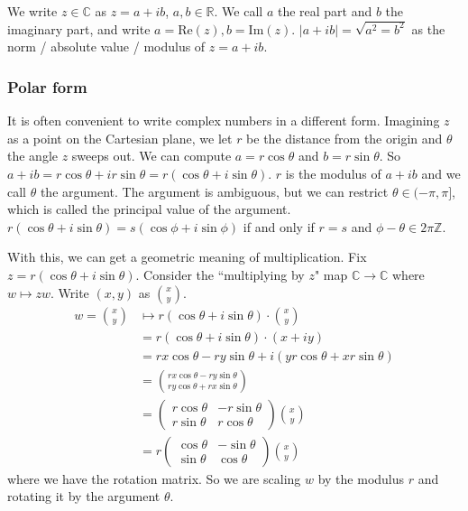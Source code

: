 \documentclass{article}
\theoremstyle{plain}
\theoremstyle{remark}
\newcommand{\Z}{{\mathbb Z}}
\newcommand{\R}{{\mathbb R}}
\newcommand{\C}{{\mathbb C}}
\begin{document}
We write $z \in \C$ as $z = a+ib$, $a,b \in \R$.
We call $a$ the real part and $b$ the imaginary part,
and write $a = \mathrm{Re}(z), b = \mathrm{Im}(z)$.
$|a+ib| = \sqrt{a^2 = b^2}$ as the norm / absolute value / modulus of $z = a + ib$.

\subsubsection{Polar form}
It is often convenient to write complex numbers in a different form.
Imagining $z$ as a point on the Cartesian plane,
we let $r$ be the distance from the origin and $\theta$ the angle $z$ sweeps out.
We can compute $a = r\cos\theta$ and $b = r\sin\theta$.
So $a+ib = r\cos\theta + ir\sin\theta = r(\cos\theta + i\sin\theta)$.
$r$ is the modulus of $a + ib$ and we call $\theta$ the argument.
The argument is ambiguous, but we can restrict $\theta \in (-\pi,\pi]$,
which is called the principal value of the argument.
$r(\cos\theta + i\sin\theta) = s(\cos\phi + i\sin\phi)$ if and only if
$r = s$ and $\phi - \theta \in 2\pi\Z$.

With this, we can get a geometric meaning of multiplication.
Fix $z = r(\cos\theta +i \sin\theta)$.
Consider the ``multiplying by $z$" map $\C \to \C$ where $w \mapsto zw$.
Write $(x,y)$ as $\binom{x}{y}$.
\begin{align*}
	w = \binom{x}{y} &\mapsto r(\cos\theta + i\sin\theta)\cdot\binom{x}{y}\\
	&= r(\cos\theta + i\sin\theta)\cdot(x+iy)\\
	&= rx\cos\theta - ry\sin\theta + i(yr\cos\theta + xr\sin\theta)\\
	&= \binom{rx\cos\theta - ry\sin\theta}{ry\cos\theta+rx\sin\theta}\\
	&= \begin{pmatrix} r\cos\theta & -r\sin\theta\\ r\sin\theta & r\cos\theta \end{pmatrix}
	\binom{x}{y}\\
	&= r\begin{pmatrix} \cos\theta & -\sin\theta\\ \sin\theta & \cos\theta \end{pmatrix}
	\binom{x}{y}
\end{align*}
where we have the rotation matrix.
So we are scaling $w$ by the modulus $r$ and rotating it by the argument $\theta$.
\end{document}
